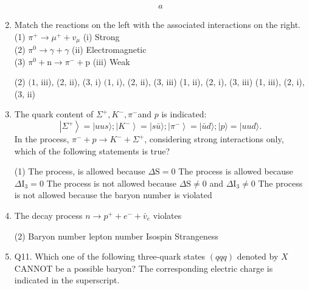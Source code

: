 \begin{enumerate}
\begin{answer}
	\begin{align*}
a	
	\end{align*}
\end{answer}
	\item  Match the reactions on the left with the associated interactions on the right.\\
	(1) $\pi^{+} \rightarrow \mu^{+}+v_\mu$\hspace{3cm}
	(i) Strong\\
	(2) $\pi^0 \rightarrow \gamma+\gamma$\hspace{3.5cm}
	(ii) Electromagnetic\\
	(3) $\pi^0+\mathrm{n} \rightarrow \pi^{-}+\mathrm{p}$\hspace{2.6cm}
	(iii) Weak
	{}
	 \begin{tasks}(2)
		\task[\textbf{a.}]$(1$, iii), (2, ii), (3, i)
		\task[\textbf{b.}]$(1$, i), (2, ii), (3, iii)
		\task[\textbf{c.}](1, ii), (2, i), (3, iii)
		\task[\textbf{d.}](1, iii), (2, i), (3, ii) 
	\end{tasks}
	\item  The quark content of $\Sigma^{+}, K^{-}, \pi^{-}$and $p$ is indicated:
	$$
	\left|\Sigma^{+}\right\rangle=|u u s\rangle ;\left|K^{-}\right\rangle=|s \bar{u}\rangle ;\left|\pi^{-}\right\rangle=|\bar{u} d\rangle ;|p\rangle=|u u d\rangle .
	$$
	In the process, $\pi^{-}+p \rightarrow K^{-}+\Sigma^{+}$, considering strong interactions only, which of the following statements is true?
	{}
	 \begin{tasks}(1)
		\task[\textbf{a.}]The process, is allowed because $\Delta \mathrm{S}=0$
		\task[\textbf{b.}] The process is allowed because $\Delta \mathrm{I}_3=0$
		\task[\textbf{c.}] The process is not allowed because $\Delta \mathrm{S} \neq 0$ and $\Delta \mathrm{I}_3 \neq 0$
		\task[\textbf{d.}]The process is not allowed because the baryon number is violated 
	\end{tasks}
	\item  The decay process $n \rightarrow p^{+}+e^{-}+\bar{v}_e$ violates
	{}
	 \begin{tasks}(2)
		\task[\textbf{a.}]Baryon number
		\task[\textbf{b.}] lepton number
		\task[\textbf{c.}] Isospin
		\task[\textbf{d.}] Strangeness
	\end{tasks}
	\item Q11. Which one of the following three-quark states $(q q q)$ denoted by $X$ CANNOT be a possible baryon? The corresponding electric charge is indicated in the superscript.

\end{enumerate}
